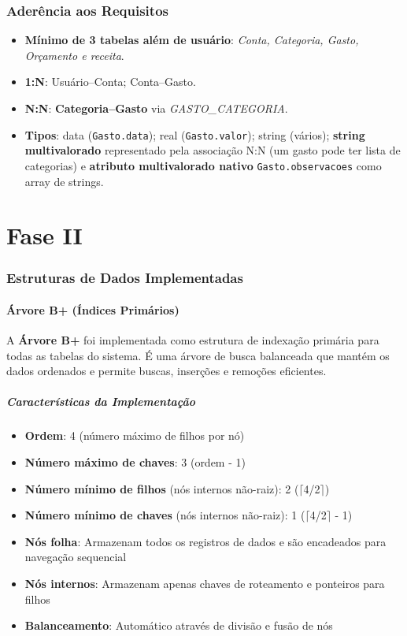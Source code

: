 \documentclass[12pt,a4paper]{article}
\begin{document}
\section{Aderência aos Requisitos}
\begin{itemize}
  \item \textbf{Mínimo de 3 tabelas além de usuário}: \textit{Conta, Categoria, Gasto, Orçamento e receita}.
  \item \textbf{1:N}: Usuário–Conta; Conta–Gasto.
  \item \textbf{N:N}: \textbf{Categoria–Gasto} via \textit{GASTO\_CATEGORIA}.
  \item \textbf{Tipos}: data (\texttt{Gasto.data}); real (\texttt{Gasto.valor});
        string (vários); \textbf{string multivalorado} representado pela associação N:N (um gasto pode ter lista de categorias) e \textbf{atributo multivalorado nativo} \texttt{Gasto.observacoes} como array de strings.
\end{itemize}

\newpage
\part*{Fase II}

\section{Estruturas de Dados Implementadas}

\subsection{Árvore B+ (Índices Primários)}

A \textbf{Árvore B+} foi implementada como estrutura de indexação primária para todas as tabelas do sistema.
É uma árvore de busca balanceada que mantém os dados ordenados e permite buscas, inserções e remoções eficientes.

\subsubsection*{Características da Implementação}
\begin{itemize}
  \item \textbf{Ordem}: 4 (número máximo de filhos por nó)
  \item \textbf{Número máximo de chaves}: 3 (ordem - 1)
  \item \textbf{Número mínimo de filhos} (nós internos não-raiz): 2 ($\lceil$4/2$\rceil$)
  \item \textbf{Número mínimo de chaves} (nós internos não-raiz): 1 ($\lceil$4/2$\rceil$ - 1)
  \item \textbf{Nós folha}: Armazenam todos os registros de dados e são encadeados para navegação sequencial
  \item \textbf{Nós internos}: Armazenam apenas chaves de roteamento e ponteiros para filhos
  \item \textbf{Balanceamento}: Automático através de divisão e fusão de nós
\end{itemize}
\end{document}
